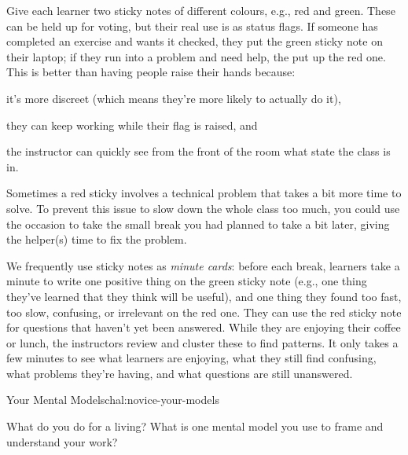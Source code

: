 


Give each learner two sticky notes of different colours, e.g., red and
green. These can be held up for voting, but their real use is as
status flags. If someone has completed an exercise and wants it
checked, they put the green sticky note on their laptop; if they run
into a problem and need help, the put up the red one. This is better
than having people raise their hands because:

\begin{gitemize}

\item
  it's more discreet (which means they're more likely to
  actually do it),

\item
  they can keep working while their flag is raised, and

\item
  the instructor can quickly see from the front of the room what
  state the class is in.

\end{gitemize}

Sometimes a red sticky involves a technical problem that takes a bit
more time to solve. To prevent this issue to slow down the whole class
too much, you could use the occasion to take the small break you had
planned to take a bit later, giving the helper(s) time to fix the
problem.


We frequently use sticky notes as \emph{minute cards}: before each
break, learners take a minute to write one positive thing on the green
sticky note (e.g., one thing they've learned that they think will be
useful), and one thing they found too fast, too slow, confusing, or
irrelevant on the red one. They can use the red sticky note for
questions that haven't yet been answered. While they are enjoying
their coffee or lunch, the instructors review and cluster these to
find patterns. It only takes a few minutes to see what learners are
enjoying, what they still find confusing, what problems they're
having, and what questions are still unanswered.


\begin{challenge}{Your Mental Models}{chal:novice-your-models}

What do you do for a living? What is one mental model you use to frame
and understand your work?

\end{challenge}

